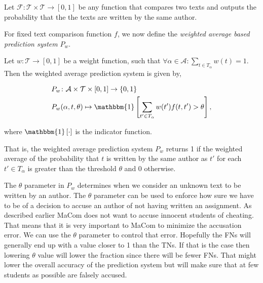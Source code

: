 \begin{definition}
    \label{def:text_comparison_function}

    Let $\mathcal{F} \colon \mathcal{T} \times \mathcal{T} \rightarrow [0, 1]$
    be any function that compares two texts and outputs the probability that the
    the texts are written by the same author.

\end{definition}

For fixed text comparison function $f$, we now define the \textit{weighted
average based prediction system} $P_w$.

\begin{definition}
    \label{def:weighted_average_prediction_system}

    Let $w: \mathcal{T} \rightarrow [0, 1]$ be a weight function, such that
    $\forall \alpha \in \mathcal{A}: \sum_{t \in T_\alpha} w(t) = 1$. Then the
    weighted average prediction system is given by,

    \begin{align}
        &P_w \colon \mathcal{A} \times \mathcal{T} \times [0, 1] \rightarrow
            \{0, 1\} \\
        &P_w(\alpha, t, \theta) \mapsto \mathbbm{1}\left[
                \sum_{t' \in T_\alpha} w(t') f(t, t') > \theta
            \right],
    \end{align}

    where $\mathbbm{1}\left[\cdot\right]$ is the indicator function.

\end{definition}

That is, the weighted average prediction system $P_w$ returns 1 if the weighted
average of the probability that $t$ is written by the same author as $t'$ for
each $t' \in T_\alpha$ is greater than the threshold $\theta$ and 0 otherwise.

The $\theta$ parameter in $P_w$ determines when we consider an unknown text
to be written by an author. The $\theta$ parameter can be used to enforce how
sure we have to be of a decision to accuse an author of not having written
an assignment. As described earlier MaCom does not want to accuse innocent
students of cheating. That means that it is very important to MaCom to minimize
the accusation error. We can use the $\theta$ parameter to control that error.
Hopefully the \glspl{FN} will generally end up with a value closer to 1 than
the \glspl{TN}. If that is the case then lowering $\theta$ value will lower the
fraction since there will be fewer \glspl{FN}. That might lower the overall
accuracy of the prediction system but will make sure that at few students as
possible are falsely accused.

